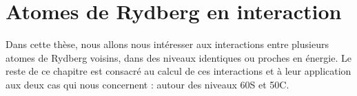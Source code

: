 
\section{Atomes de Rydberg en interaction}
Dans cette thèse, nous allons nous intéresser aux interactions entre plusieurs atomes de Rydberg voisins, dans des niveaux identiques ou proches en énergie.
Le reste de ce chapitre est consacré au calcul de ces interactions et à leur application aux deux cas qui nous concernent : autour des niveaux 60S et 50C.

